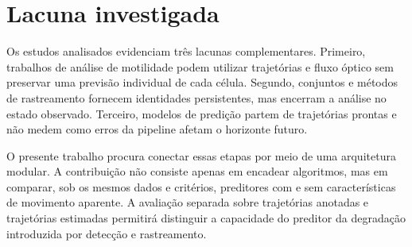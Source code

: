 \section{Lacuna investigada}

Os estudos analisados evidenciam três lacunas complementares. Primeiro, trabalhos de análise de motilidade podem utilizar trajetórias e fluxo óptico sem preservar uma previsão individual de cada célula. Segundo, conjuntos e métodos de rastreamento fornecem identidades persistentes, mas encerram a análise no estado observado. Terceiro, modelos de predição partem de trajetórias prontas e não medem como erros da pipeline afetam o horizonte futuro.

O presente trabalho procura conectar essas etapas por meio de uma arquitetura modular. A contribuição não consiste apenas em encadear algoritmos, mas em comparar, sob os mesmos dados e critérios, preditores com e sem características de movimento aparente. A avaliação separada sobre trajetórias anotadas e trajetórias estimadas permitirá distinguir a capacidade do preditor da degradação introduzida por detecção e rastreamento.
